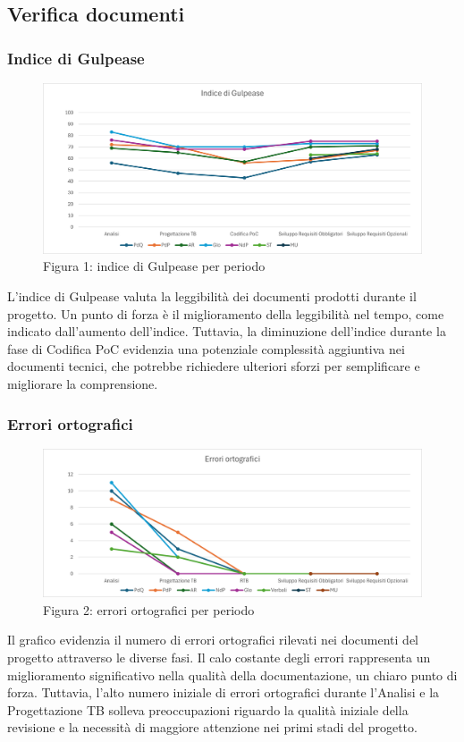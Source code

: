 \documentclass{article}
\begin{document}
\subsection{Verifica documenti}
\subsubsection{Indice di Gulpease}

    \begin{figure}[H]
    \centering
    \includegraphics[width=\textwidth]{documenti/grafici/IndiceDiGulpeasePB.png}
     \caption{Figura 1: indice di Gulpease per periodo}
    \end{figure}

    L'indice di Gulpease valuta la leggibilità dei documenti prodotti durante il progetto. Un punto di forza è il miglioramento della leggibilità nel tempo, come indicato dall'aumento dell'indice. Tuttavia, la diminuzione dell'indice durante la fase di Codifica PoC evidenzia una potenziale complessità aggiuntiva nei documenti tecnici, che potrebbe richiedere ulteriori sforzi per semplificare e migliorare la comprensione.



\subsubsection{Errori ortografici}
   \begin{figure}[H]
    \centering
    \includegraphics[width=\textwidth]{documenti/grafici/ErroriOrtograficiPB.png}
     \caption{Figura 2: errori ortografici per periodo}
    \end{figure}
     Il grafico evidenzia il numero di errori ortografici rilevati nei documenti del progetto attraverso le diverse fasi. Il calo costante degli errori rappresenta un miglioramento significativo nella qualità della documentazione, un chiaro punto di forza. Tuttavia, l'alto numero iniziale di errori ortografici durante l'Analisi e la Progettazione TB solleva preoccupazioni riguardo la qualità iniziale della revisione e la necessità di maggiore attenzione nei primi stadi del progetto.
\end{document}

